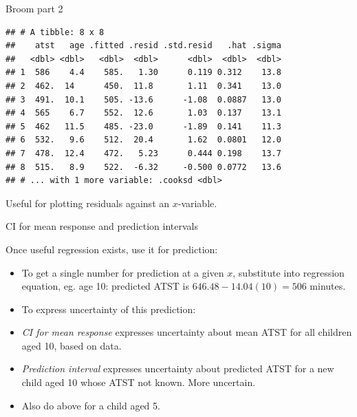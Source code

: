 \documentclass[
  ignorenonframetext,
]{beamer}
\newenvironment{Shaded}{\begin{snugshade}}{\end{snugshade}}
\newcommand{\DecValTok}[1]{\textcolor[rgb]{0.00,0.00,0.81}{#1}}
\newcommand{\FloatTok}[1]{\textcolor[rgb]{0.00,0.00,0.81}{#1}}
\newcommand{\KeywordTok}[1]{\textcolor[rgb]{0.13,0.29,0.53}{\textbf{#1}}}
\newcommand{\NormalTok}[1]{#1}
\newcommand{\OperatorTok}[1]{\textcolor[rgb]{0.81,0.36,0.00}{\textbf{#1}}}
\newcommand{\StringTok}[1]{\textcolor[rgb]{0.31,0.60,0.02}{#1}}
\begin{document}
\begin{frame}[fragile]{Broom part 2}
\protect\hypertarget{broom-part-2}{}

\begin{Shaded}
\end{Shaded}

\begin{verbatim}
## # A tibble: 8 x 8
##    atst   age .fitted .resid .std.resid   .hat .sigma
##   <dbl> <dbl>   <dbl>  <dbl>      <dbl>  <dbl>  <dbl>
## 1  586    4.4    585.   1.30      0.119 0.312    13.8
## 2  462.  14      450.  11.8       1.11  0.341    13.0
## 3  491.  10.1    505. -13.6      -1.08  0.0887   13.0
## 4  565    6.7    552.  12.6       1.03  0.137    13.1
## 5  462   11.5    485. -23.0      -1.89  0.141    11.3
## 6  532.   9.6    512.  20.4       1.62  0.0801   12.0
## 7  478.  12.4    472.   5.23      0.444 0.198    13.7
## 8  515.   8.9    522.  -6.32     -0.500 0.0772   13.6
## # ... with 1 more variable: .cooksd <dbl>
\end{verbatim}

Useful for plotting residuals against an \(x\)-variable.

\end{frame}

\begin{frame}{CI for mean response and prediction intervals}
\protect\hypertarget{ci-for-mean-response-and-prediction-intervals}{}

Once useful regression exists, use it for prediction:

\begin{itemize}
\item
  To get a single number for prediction at a given \(x\), substitute
  into regression equation, eg. age 10: predicted ATST is
  \(646.48-14.04(10)=506\) minutes.
\item
  To express uncertainty of this prediction:
\item
  \emph{CI for mean response} expresses uncertainty about mean ATST for
  all children aged 10, based on data.
\item
  \emph{Prediction interval} expresses uncertainty about predicted ATST
  for a new child aged 10 whose ATST not known. More uncertain.
\item
  Also do above for a child aged 5.
\end{itemize}

\end{frame}
\end{document}

